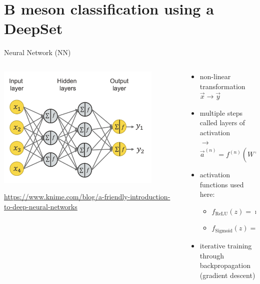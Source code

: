 \documentclass[aspectratio=1610, 10pt]{beamer}
\begin{document}
\section*{B meson classification using a DeepSet}

\begin{frame}{Neural Network (NN)}
  \begin{columns}
    \begin{column}{0.5\textwidth}
      \centering
      \includegraphics[width=0.85\textwidth]{images/NN_schematic.png}

      \tiny \url{https://www.knime.com/blog/a-friendly-introduction-to-deep-neural-networks}
    \end{column}
    \begin{column}{0.5\textwidth}
      \begin{itemize}
        \item non-linear transformation $\vec{x} \rightarrow \vec{y}$
        \item multiple steps called layers of activation \\$\rightarrow$ $\vec{a}^{(n)} = f^{(n)}\left( W^{(n)} \cdot \vec{a}^{(n-1)} + \vec{b}^{n} \right)$
        \item activation functions used here:
        \begin{itemize}
          \item $f_\text{ReLU}(z) = \max (0, z)$
          \item $f_\text{Sigmoid}(z) = \frac{1}{1+e^{-z}}$
        \end{itemize}
        \item iterative training through backpropagation (gradient descent)
      \end{itemize}
    \end{column}
  \end{columns}
\end{frame}
\end{document}
